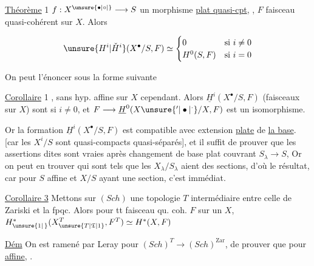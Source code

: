 

\uline{Théorème} 1 \quad $f:X^{\unsure{\bullet|\circ|{}}}\longrightarrow S$ un morphisme \uline{ plat quasi-cpt},  , $F$ faisceau quasi-cohérent sur $X$. Alors

\[
\unsure{H^i|\check H^i}(X^{\bullet}/S,F)\simeq
\begin{cases}0&\text{si }i\ne0\\ H^0(S,F)&\text{si }i=0\end{cases}
\]

On peut l'énoncer sous la forme suivante

\uline{Corollaire} 1 \quad {} , sans hyp. affine sur $X$ cependant. Alors $\underline H^i(X^{\bullet}/S,F)$ (faisceaux  sur $X$)   sont  si $i\ne0$, et $F\longrightarrow\underline H^0(X\unsure{'|\bullet|^{\cdot}}/X,F)$ est un isomorphisme.

Or la formation  $\underline H^i(X^{\bullet}/S,F)$ est compatible avec extension \uline{plate} de \uline{la base}. [car les $X^{i}/S$ sont quasi-compacts quasi-séparés], et il suffit de prouver que les assertions dites sont vraies après changement de base plat couvrant $S_\lambda\longrightarrow S$,  Or on peut en trouver qui sont tels que les $X_\lambda/S_\lambda$ aient des sections, d'où le résultat, car pour $S$ affine et $X/S$ ayant une section, c'est immédiat.


\uline{Corollaire 3} Mettons sur $(Sch)$ une topologie $T$ intermédiaire entre celle de Zariski et la fpqc. Alors pour tt faisceau qu. coh. $F$ sur un $X$, $H^*_{\unsure{1|\,}}(X^T_{\unsure{T|\mathfrak{T}|1}},F^T)\simeq H^*(X,F)$

\uline{Dém} On est ramené par Leray pour $(Sch)^T\longrightarrow(Sch)^{\mathrm{Zar}}$, de prouver que pour  \uline{affine}, .

